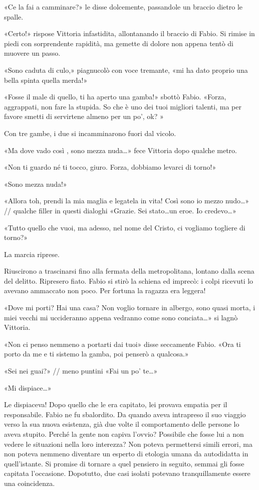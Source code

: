 «Ce la fai a camminare?» le disse dolcemente, passandole un braccio dietro le spalle.

«Certo!» rispose Vittoria infastidita, allontanando il braccio di Fabio. Si rimise in piedi con sorprendente rapidità, ma gemette di dolore non appena tentò di muovere un passo.

«Sono caduta di culo,» piagnucolò con voce tremante, «mi ha dato proprio una bella spinta quella merda!»

«Fosse il male di quello, ti ha aperto una gamba!» sbottò Fabio. «Forza, aggrappati, non fare la stupida. So che è uno dei tuoi migliori talenti, ma per favore smetti di servirtene almeno per un po', ok? »

Con tre gambe, i due si incamminarono fuori dal vicolo.

«Ma dove vado così , sono mezza nuda\ldots» fece Vittoria dopo qualche metro.

«Non ti guardo né ti tocco, giuro. Forza, dobbiamo levarci di torno!»

«Sono mezza nuda!»

«Allora toh, prendi la mia maglia e legatela in vita! Così sono io mezzo nudo\ldots»
// qualche filler in questi dialoghi
«Grazie. Sei stato\ldots un eroe. Io credevo\ldots»

«Tutto quello che vuoi, ma adesso, nel nome del Cristo, ci vogliamo togliere di torno?»

La marcia riprese.

Riuscirono a trascinarsi fino alla fermata della metropolitana, lontano dalla scena del delitto. Ripresero fiato. Fabio si stirò la schiena ed imprecò: i colpi ricevuti lo avevano ammaccato non poco. Per fortuna la ragazza era leggera!

«Dove mi porti? Hai una casa? Non voglio tornare in albergo, sono quasi morta, i miei vecchi mi uccideranno appena vedranno come sono conciata\ldots» si lagnò Vittoria.

«Non ci penso nemmeno a portarti dai tuoi» disse seccamente Fabio. «Ora ti porto da me e ti sistemo la gamba, poi penserò a qualcosa.»

«Sei nei guai?»
// meno puntini
«Fai un po' te\ldots»

«Mi dispiace\ldots»

Le dispiaceva! Dopo quello che le era capitato, lei provava empatia per il responsabile. Fabio ne fu sbalordito. Da quando aveva intrapreso il suo viaggio verso la sua nuova esistenza, già due volte il comportamento delle persone lo aveva stupito. Perché la gente non capiva l'ovvio? Possibile che fosse lui a non vedere le situazioni nella loro interezza? Non poteva permettersi simili errori, ma non poteva nemmeno diventare un esperto di etologia umana da autodidatta in quell'istante. Si promise di tornare a quel pensiero in seguito, semmai gli fosse capitata l'occasione. Dopotutto, due casi isolati potevano tranquillamente essere una coincidenza.

